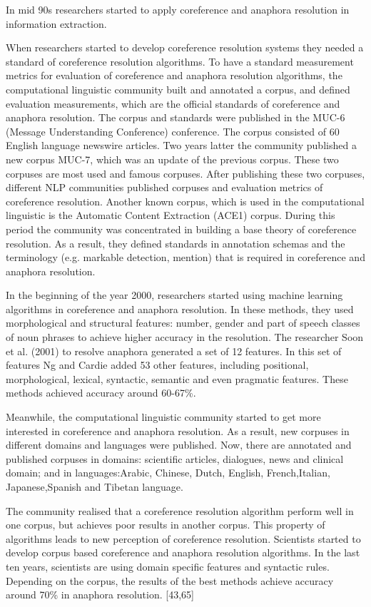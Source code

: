In mid 90s researchers started to apply coreference and anaphora resolution in information extraction. 

When researchers started to develop coreference resolution systems they needed a standard of coreference resolution algorithms. To have a standard measurement metrics for evaluation of coreference and anaphora resolution algorithms, the computational linguistic community built and annotated a corpus, and defined evaluation measurements, which are the official standards of coreference and anaphora resolution. The corpus and standards were published in the MUC-6 (Message Understanding Conference) conference. The corpus consisted of 60 English language newswire articles. Two years latter the community published a new corpus MUC-7, which was an update of the previous corpus. These two corpuses are most used and famous corpuses. After publishing these two corpuses, different NLP communities published corpuses and evaluation metrics of coreference resolution. Another known corpus, which is used in the computational linguistic is the Automatic Content Extraction (ACE1) corpus. During this period the community was concentrated in building a base theory of coreference resolution. As a result, they defined standards in annotation schemas and the terminology (e.g. markable detection, mention) that is required in coreference and anaphora resolution. 

In the beginning of the year 2000, researchers started using machine learning algorithms in coreference and anaphora resolution. In these methods, they used morphological and structural features: number, gender and part of speech  classes of noun phrases to achieve higher accuracy in the resolution. The researcher Soon et al. (2001) to resolve anaphora generated a set of 12 features. In this set of features Ng and Cardie added 53 other features, including positional, morphological, lexical, syntactic, semantic and even pragmatic features. These methods achieved accuracy around 60-67\%. 

 Meanwhile, the computational linguistic community started to get more interested in coreference and anaphora resolution. As a result, new corpuses in different domains and languages were published. Now, there are annotated and published corpuses in domains: scientific articles, dialogues, news and clinical domain; and in languages:Arabic, Chinese, Dutch, English, French,Italian, Japanese,Spanish and Tibetan language. 

The community realised that a coreference resolution algorithm perform well in one corpus, but achieves poor results in another corpus. This property of algorithms leads to new perception of coreference resolution. Scientists started to develop corpus based coreference and anaphora resolution algorithms. In the last ten years, scientists are using domain specific features and syntactic rules. Depending on the corpus, the results of the best methods achieve accuracy around 70\% in anaphora resolution. [43,65]

